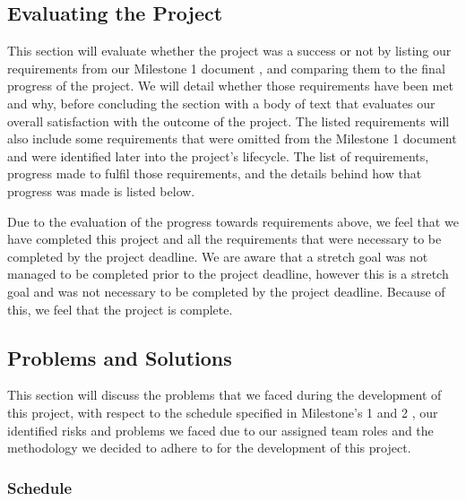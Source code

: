         \subsection{Evaluating the Project}
        \label{subsec:evaluation}

            This section will evaluate whether the project was a success or not by listing our requirements from our Milestone 1 document \cite{coaker}, and comparing them to the final progress of the project. We will detail whether those requirements have been met and why, before concluding the section with a body of text that evaluates our overall satisfaction with the outcome of the project. The listed requirements will also include some requirements that were omitted from the Milestone 1 document \cite{coaker} and were identified later into the project's lifecycle. The list of requirements, progress made to fulfil those requirements, and the details behind how that progress was made is listed below.

            
            \vspace{2em}

            Due to the evaluation of the progress towards requirements above, we feel that we have completed this project and all the requirements that were necessary to be completed by the project deadline. We are aware that a stretch goal was not managed to be completed prior to the project deadline, however this is a stretch goal and was not necessary to be completed by the project deadline. Because of this, we feel that the project is complete.

        \subsection{Problems and Solutions}
        \label{subsec:probs_solutions}

            This section will discuss the problems that we faced during the development of this project, with respect to the schedule specified in Milestone's 1 and 2 \cite{coaker, mile2}, our identified risks and problems we faced due to our assigned team roles and the methodology we decided to adhere to for the development of this project. 

            \subsubsection{Schedule}
            \label{subsec:schedule}

